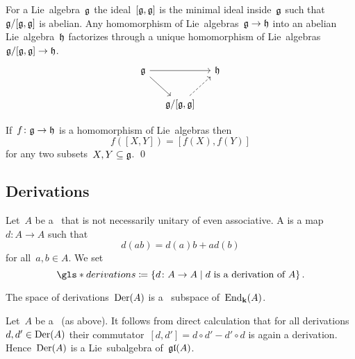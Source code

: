 \begin{remark}
  For a Lie~algebra~$\mathfrak{g}$ the ideal~$[\mathfrak{g},\mathfrak{g}]$ is the minimal ideal inside~$\mathfrak{g}$ such that~$\mathfrak{g}/[\mathfrak{g},\mathfrak{g}]$ is abelian.
  Any homomorphism of Lie~algebras~$\mathfrak{g} \to \mathfrak{h}$ into an abelian Lie~algebra~$\mathfrak{h}$ factorizes through a unique homomorphism of Lie~algebras~$\mathfrak{g}/[\mathfrak{g}, \mathfrak{g}] \to \mathfrak{h}$.
  \[
    \begin{tikzcd}[column sep = small]
      \glie
      \arrow{rr}
      \arrow{dr}
      &
      {}
      &
      \hlie
      \\
      {}
      &
      \glie/[\glie,\glie]
      \arrow[dashed]{ur}
      &
      {}
    \end{tikzcd}
  \]
\end{remark}


\begin{lemma}
  \label{homomorphisms respect commutators of sets}
  If~$f \colon \mathfrak{g} \to \mathfrak{h}$ is a homomorphism of Lie~algebras then
  \[
    f([X,Y])
    =
    [f(X), f(Y)]
  \]
  for any two subsets~$X, Y \subseteq \mathfrak{g}$.
  \qed
\end{lemma}




\subsection{Derivations}


\begin{definition}
  Let~$A$ be a~{\algebra{$\kf$}} that is not necessarily unitary of even associative.
  A  is a {\linear{$\kf$}} map~$d \colon A \to A$ such that
  \[
    d(ab)
    =
    d(a)b + ad(b)
  \]
  for all~$a, b \in A$.
  We set
  \[
    \gls*{derivations}
    \defined
    \{
      d
      \colon
      A
      \to
      A
    \suchthat
      \text{$d$ is a derivation of~$A$}
    \}  \,.
  \]
\end{definition}


\begin{remark}
  The space of derivations~$\operatorname{Der}(A)$ is a~{\linear{$\kf$}} subspace of~$\operatorname{End}_{\mathbf{k}}(A)$.
\end{remark}


\begin{example}
  Let~$A$ be a~{\algebra{$\kf$}} (as above).
  It follows from direct calculation that for all derivations~$d, d' \in \operatorname{Der}(A)$ their commutator~$[d,d'] = d \circ d' - d' \circ d$ is again a derivation.
  Hence~$\operatorname{Der}(A)$ is a Lie~subalgebra of~$\mathfrak{gl}(A)$.
\end{example}


